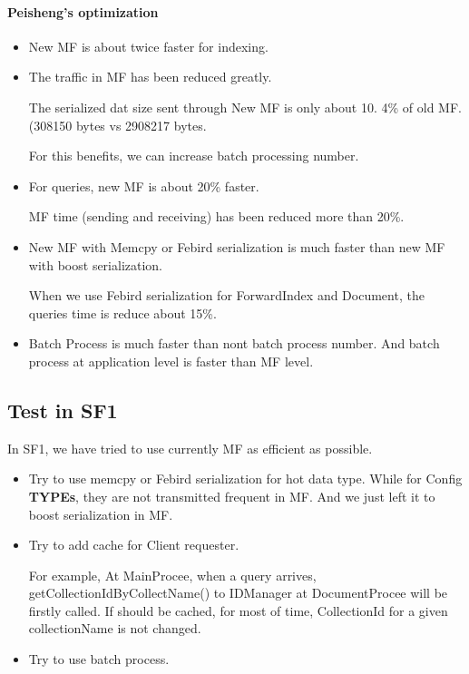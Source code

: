 \documentclass[a4paper,10pt]{article}
\begin{document}
\paragraph{Peisheng's optimization}

\begin{itemize}

\item  New MF is about twice faster for indexing.

\item  The traffic in MF has been reduced greatly.

The serialized dat size sent through New MF  is only about 10. 4\%
of old MF.  (308150 bytes vs 2908217 bytes.

For this benefits, we can increase batch processing number.

\item  For queries, new MF is about  20\% faster.

MF time (sending and receiving) has been  reduced more than 20\%.


\item  New MF with Memcpy or Febird serialization  is much faster than new MF with boost serialization.

   When we use Febird serialization for ForwardIndex and Document,  the queries time is reduce about 15\%.

\item  Batch Process is much faster than nont batch process number. And batch process at application level is faster than
MF level.

\end{itemize}

\subsection{Test in SF1}

In SF1, we have tried to use currently MF as efficient as possible.

\begin{itemize}

\item Try to use memcpy or Febird serialization for hot data type.
While for Config \textbf{TYPEs}, they are not transmitted frequent
in MF. And we just left it to boost serialization in MF.

\item  Try to add cache for Client requester.

    For example,
    At MainProcee, when a query arrives,
    getCollectionIdByCollectName() to IDManager at DocumentProcee will be firstly called.
    If should be cached, for most of time, CollectionId for a given collectionName is not changed.

\item  Try to use batch process.

\end{itemize}
\end{document}
